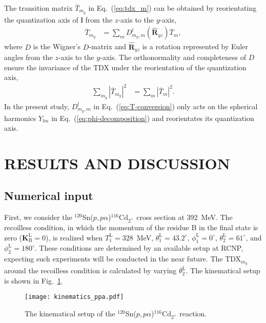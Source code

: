 \documentclass[%
 reprint,
superscriptaddress,
 amsmath,amssymb,
 aps,
]{revtex4-2}
\begin{document}
The transition matrix $\bar{T}_{m_y}$ in Eq.~(\ref{eq:tdx_m}) can be obtained by 
reorientating the quantization axis of $\bm{l}$ 
from the $z$-axis to the $y$-axis,
\begin{align}
  \bar{T}_{m_y}
  &=
  \sum_{m}D^{l}_{m_y,m}(\hat{\bm{R}}_{yz})
  \bar{T}_m,
  \label{eq:T-conversion}
\end{align}
where $D$ is the Wigner's $D$-matrix and $\hat{\bm{R}}_{yz}$ is a
rotation represented by Euler angles from the $z$-axis to the $y$-axis.
The orthonormality and completeness of $D$ ensure the invariance of the TDX
under the reorientation of the quantization axis,
\begin{align}
  \sum_{m_y}\left|\bar{T}_{m_y}\right|^2
  &=
  \sum_{m  }\left|\bar{T}_{m  }\right|^2.
\end{align}
In the present study, $D^{l}_{m_y,m}$ in Eq.~(\ref{eq:T-conversion}) only acts on 
the spherical harmonics $Y_{lm}$ in Eq.~(\ref{eq:phi-decomposition})
and reorientates its quantization axis.




\section{RESULTS AND DISCUSSION}\label{sec:results}
\subsection{Numerical input}
First, we consider the $^{120}$Sn($p,p\alpha$)$^{116}\mathrm{Cd}_{2^+}$ cross section at 392~MeV.
The recoilless condition, in which the momentum of the residue B in the
final state is zero ($\bm{K}^\mathrm{L}_{\mathrm{B}} = 0$),
is realized when $T^\mathrm{L}_1 = 328$~MeV, $\theta_1^\mathrm{L} = 43.2^\circ$, 
$\phi_1^\mathrm{L} = 0^\circ$, 
$\theta_2^\mathrm{L} = 61^\circ$, and $\phi_2^\mathrm{L} = 180^\circ$.
These conditions are determined by an available setup at RCNP, expecting such experiments will be conducted in the near future.
The TDX$_{m_y}$ around the recoilless condition is calculated by 
varying $\theta_2^\mathrm{L}$.
The kinematical setup is shown in Fig.~\ref{fig:kinematics}.
\begin{figure}[h]
  \centering
  \texttt{[image: kinematics\_ppa.pdf]}
  \caption{The kinematical setup of the $^{120}$Sn($p,p\alpha$)$^{116}\mathrm{Cd}_{2^+}$ reaction.}
  \label{fig:kinematics}
\end{figure}
\end{document}
